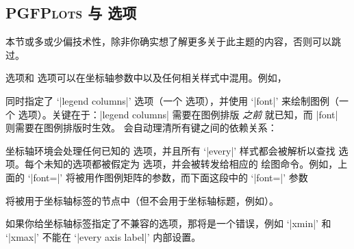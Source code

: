 


\subsection{\textsc{PGFPlots} 与 \Tikz{} 选项}

本节或多或少偏技术性，除非你确实想了解更多关于此主题的内容，否则可以跳过。

\Tikz{} 选项和 \PGFPlots{} 选项可以在坐标轴参数中以及任何相关样式中混用。例如，
%
\begin{codeexample}
\end{codeexample}
%
\noindent 同时指定了 `|legend columns|' 选项（一个 \PGFPlots{} 选项），并使用 `|font|' 来绘制图例（一个 \Tikz{} 选项）。关键在于：|legend columns| 需要在图例排版 \emph{之前} 就已知，而 |font| 则需要在图例排版时生效。\PGFPlots{} 会自动理清所有键之间的依赖关系：

坐标轴环境会处理任何已知的 \PGFPlots{} 选项，并且所有 `|every|' 样式都会被解析以查找 \PGFPlots{} 选项。每个未知的选项都被假定为 \Tikz{} 选项，并会被转发给相应的 \Tikz{} 绘图命令。例如，上面的 `|font=\Large|' 将被用作图例矩阵的参数，而下面这段中的 `|font=\Large|' 参数
%
\begin{codeexample}
\end{codeexample}
%
将被用于坐标轴标签的节点中（但不会用于坐标轴标题，例如）。

如果你给坐标轴标签指定了不兼容的选项，那将是一个错误，例如 `|xmin|' 和 `|xmax|' 不能在 `|every axis label|' 内部设置。
